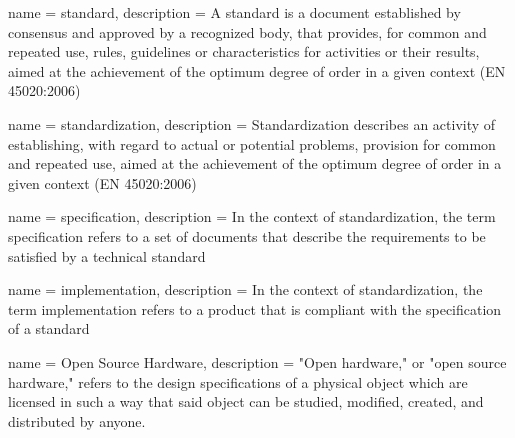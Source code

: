  { name = {standard},
  description = {A standard is a document established by consensus and
    approved by a recognized body, that provides, for common and
    repeated use, rules, guidelines or characteristics for activities
    or their results, aimed at the achievement of the optimum degree
    of order in a given context (EN 45020:2006)} }

 { name = {standardization},
  description = {Standardization describes an activity of
    establishing, with regard to actual or potential problems,
    provision for common and repeated use, aimed at the achievement of
    the optimum degree of order in a given context (EN 45020:2006)} }



 { name = {specification}, description = {In
    the context of \gls{standardization}, the term specification
    refers to a set of documents that describe the requirements to be
    satisfied by a technical standard} }

 { name = {implementation}, description = {In
    the context of \gls{standardization}, the term implementation
    refers to a product that is compliant with the specification of a
    standard} }

 { name = {Open Source Hardware}, description = {
"Open hardware," or "open source hardware," refers to the design
specifications of a physical object which are licensed in such a way
that said object can be studied, modified, created, and distributed by
anyone.} }
